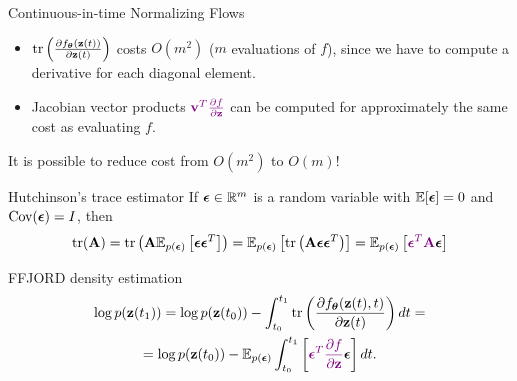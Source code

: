 \begin{frame}{Continuous-in-time Normalizing Flows}
	\vspace{0.2cm}
	\begin{itemize}
		\item $\text{tr} \left( \frac{\partial f_{\boldsymbol{\theta}}(\mathbf{z}(t))}{\partial \mathbf{z}(t)} \right)$ costs $O(m^2)$ ($m$
		evaluations of $f$), since we have to compute a derivative for each diagonal element. 
		\item Jacobian vector products ${\color{violet}\mathbf{v}^T \frac{\partial f}{\partial \mathbf{z}}}$ can be computed for approximately the same cost as evaluating $f$.
	\end{itemize}
	It is possible to reduce cost from $O(m^2)$ to $O(m)$!
	\begin{block}{Hutchinson's trace estimator}
		If $\boldsymbol{\epsilon} \in \mathbb{R}^m$ is a random variable with $\mathbb{E} [\boldsymbol{\epsilon}] = 0$ and $\text{Cov} (\boldsymbol{\epsilon}) = I$, then
		\vspace{-0.3cm}
		\[
		    \text{tr}(\mathbf{A}) = \text{tr}\left(\mathbf{A}\mathbb{E}_{p(\boldsymbol{\epsilon})} \left[ \boldsymbol{\epsilon} \boldsymbol{\epsilon}^T \right]\right) =  \mathbb{E}_{p(\boldsymbol{\epsilon})} \left[  \text{tr}\left(  \mathbf{A}  \boldsymbol{\epsilon} \boldsymbol{\epsilon}^T \right) \right] =  \mathbb{E}_{p(\boldsymbol{\epsilon})} \left[ {\color{violet} \boldsymbol{\epsilon}^T \mathbf{A}} \boldsymbol{\epsilon}  \right]
		\]
		\vspace{-0.6 cm}
	\end{block}
	\begin{block}{FFJORD density estimation}
		\vspace{-0.8cm}
		\begin{multline*}
		    \log p(\mathbf{z}(t_1)) = \log p(\mathbf{z}(t_0)) - \int_{t_0}^{t_1} \text{tr}  \left( \frac{\partial f_{\boldsymbol{\theta}}(\mathbf{z}(t), t)}{\partial \mathbf{z}(t)} \right) dt = \\ = \log p(\mathbf{z}(t_0)) - \mathbb{E}_{p(\boldsymbol{\epsilon})} \int_{t_0}^{t_1} \left[ {\color{violet}\boldsymbol{\epsilon}^T \frac{\partial f}{\partial \mathbf{z}}} \boldsymbol{\epsilon} \right] dt.
		\end{multline*}
	\end{block}
\end{frame}
